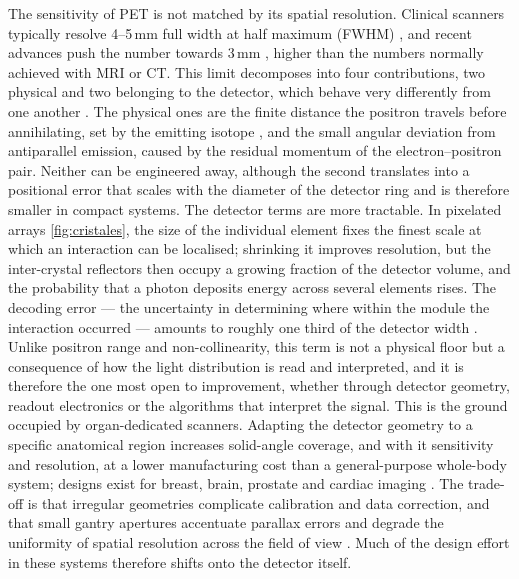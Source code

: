\documentclass[10pt,conference]{IEEEtran}
\begin{document}
The sensitivity of PET is not matched by its spatial resolution. Clinical
scanners typically resolve 4--5\,mm full width at half maximum
(FWHM) \cite{spencer2021}, and
recent advances push the number towards 3\,mm \cite{spencer2021,
gonzalezmontoro2022brain}, higher than the numbers normally achieved with MRI or CT. This limit decomposes into four
contributions, two physical and two belonging to the detector, which behave
very differently from one another \cite{moses2011}. The physical ones are
the finite distance the positron travels before annihilating, set by the
emitting isotope \cite{levin1999}, and the small angular deviation from
antiparallel emission, caused by the residual momentum of the
electron--positron pair. Neither can be engineered away, although the second
translates into a positional error that scales with the diameter of the
detector ring and is therefore smaller in compact systems. The detector terms are more tractable. In pixelated arrays \ref{fig:cristales}, the size of the
individual element fixes the finest scale at which an interaction can be
localised; shrinking it improves resolution, but the inter-crystal
reflectors then occupy a growing fraction of the detector volume, and the
probability that a photon deposits energy across several elements rises.
The decoding error --- the uncertainty in determining where within the
module the interaction occurred --- amounts to roughly one third of the
detector width \cite{moses2011}. Unlike positron range and non-collinearity,
this term is not a physical floor but a consequence of how the light
distribution is read and interpreted, and it is therefore the one most open to improvement, whether through detector geometry, readout electronics or the algorithms that interpret
the signal.
This is the ground occupied by organ-dedicated scanners. Adapting the
detector geometry to a specific anatomical region increases solid-angle
coverage, and with it sensitivity and resolution, at a lower manufacturing
cost than a general-purpose whole-body system; designs exist for breast,
brain, prostate and cardiac imaging \cite{sanaat2024}. The trade-off is that
irregular geometries complicate calibration and data correction, and that
small gantry apertures accentuate parallax errors and degrade the uniformity
of spatial resolution across the field of view \cite{sanaat2024}. Much of
the design effort in these systems therefore shifts onto the detector
itself.
\end{document}
